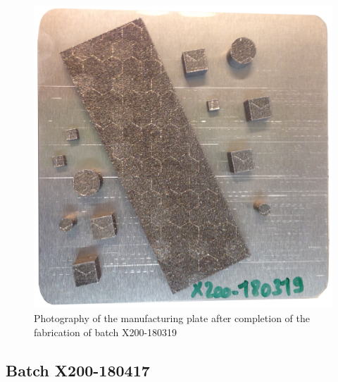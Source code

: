 \begin{figure}[h!]
\centering
\includegraphics[angle=-90,scale=0.22]{Images/180319-real}
\decoRule
\caption[Photography of the manufacturing plate after completion of the fabrication of batch X200-180319]{Photography of the manufacturing plate after completion of the fabrication of batch X200-180319}
\label{fig:180319-real}
\end{figure}

\newpage
\subsection{Batch X200-180417}

